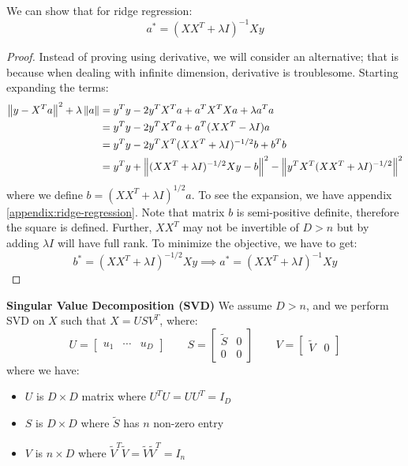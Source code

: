 \begin{theorem}
    We can show that for ridge regression:
    \begin{equation*}
        a^* = (XX^T+\lambda I)^{-1}Xy
    \end{equation*}
\end{theorem}
\begin{proof}
    Instead of proving using derivative, we will consider an alternative; that is because when dealing with infinite dimension, derivative is troublesome. Starting expanding the terms:
    \begin{equation*}
    \begin{aligned}
        \left\lVert y-X^Ta\right\rVert^2 +\lambda\left\lVert a\right\rVert &= y^Ty - 2y^TX^Ta + a^TX^TXa+\lambda a^Ta \\
        &= y^Ty - 2y^TX^T a + a^T(XX^T-\lambda I)a \\
        &= y^Ty - 2y^TX^T (XX^T+\lambda I)^{-1/2}b + b^Tb \\
        &= y^Ty + \left\lVert(XX^T + \lambda I)^{-1/2}Xy-b\right\rVert^2 - \left\lVert y^TX^T(XX^T+\lambda I)^{-1/2}\right\rVert^2
    \end{aligned}
    \end{equation*}
    where we define $b = (XX^T+\lambda I)^{1/2}a$. To see the expansion, we have appendix \ref{appendix:ridge-regression}. Note that matrix $b$ is semi-positive definite, therefore the square is defined. Further, $XX^T$ may not be invertible of $D>n$ but by adding $\lambda I$ will have full rank. To minimize the objective, we have to get:
    \begin{equation*}
        b^* = (XX^T+\lambda I)^{-1/2}Xy \implies a^* = (XX^T+\lambda I)^{-1}Xy
    \end{equation*} 
\end{proof}

\begin{definition}{\textbf{Singular Value Decomposition (SVD)}}
    We assume $D>n$, and we perform SVD on $X$ such that $X=USV^T$, where:
    \begin{equation*}
        U = \begin{bmatrix}
            u_1 & \cdots & u_D
        \end{bmatrix} \qquad S = \begin{bmatrix}
            \tilde{S} & 0 \\ 0 & 0
        \end{bmatrix} \qquad V = \begin{bmatrix}
            \tilde{V} & 0
        \end{bmatrix}
    \end{equation*}
    where we have:
    \begin{itemize}
        \item $U$ is $D\times D$ matrix where $U^TU = UU^T = I_D$ 
        \item $S$ is $D\times D$ where $\tilde{S}$ has $n$ non-zero entry
        \item $V$ is $n\times D$ where $\tilde{V}^T\tilde{V} = \tilde{V}\tilde{V}^T = I_n$
    \end{itemize}
\end{definition}

